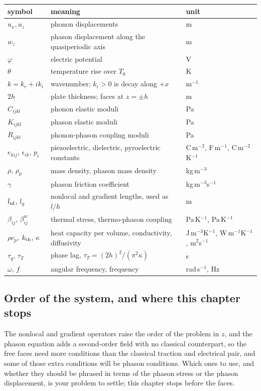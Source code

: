 \documentclass[11pt]{article}
\begin{document}
\begin{center}
\small
\begin{tabular}{p{2.4cm}p{6.7cm}p{3.4cm}}
\toprule
symbol & meaning & unit\\
\midrule
$u_x,u_z$ & phonon displacements & m\\
$w_z$ & phason displacement along the quasiperiodic axis & m\\
$\varphi$ & electric potential & V\\
$\theta$ & temperature rise over $T_0$ & K\\
$k=k_r+ik_i$ & wavenumber; $k_i>0$ is decay along $+x$ & m$^{-1}$\\
$2h$ & plate thickness; faces at $z=\pm h$ & m\\
$C_{ijkl}$ & phonon elastic moduli & Pa\\
$K_{ijkl}$ & phason elastic moduli & Pa\\
$R_{ijkl}$ & phonon-phason coupling moduli & Pa\\
$e_{kij}$, $\epsilon_{ik}$, $p_i$ & piezoelectric, dielectric, pyroelectric constants & C\,m$^{-2}$, F\,m$^{-1}$, C\,m$^{-2}$K$^{-1}$\\
$\rho$, $\rho_p$ & mass density, phason mass density & kg\,m$^{-3}$\\
$\gamma$ & phason friction coefficient & kg\,m$^{-3}$s$^{-1}$\\
$l_{\rm nl}$, $l_g$ & nonlocal and gradient lengths, used as $l/h$ & m\\
$\beta_{ij}$, $\beta^{w}_{ij}$ & thermal stress, thermo-phason coupling & Pa\,K$^{-1}$, Pa\,K$^{-1}$\\
$\rho c_p$, $k_{\rm th}$, $\kappa$ & heat capacity per volume, conductivity, diffusivity & J\,m$^{-3}$K$^{-1}$, W\,m$^{-1}$K$^{-1}$, m$^2$s$^{-1}$\\
$\tau_q$, $\tau_T$ & phase lag, $\tau_T=(2h)^2/(\pi^2\kappa)$ & s\\
$\omega$, $f$ & angular frequency, frequency & rad\,s$^{-1}$, Hz\\
\bottomrule
\end{tabular}
\end{center}

\subsection{Order of the system, and where this chapter stops}

The nonlocal and gradient operators raise the order of the problem in $z$, and the phason equation adds a
second-order field with no classical counterpart, so the free faces need more conditions than the classical
traction and electrical pair, and some of those extra conditions will be phason conditions. Which ones to
use, and whether they should be phrased in terms of the phason stress or the phason displacement, is your
problem to settle; this chapter stops before the faces.
\end{document}
